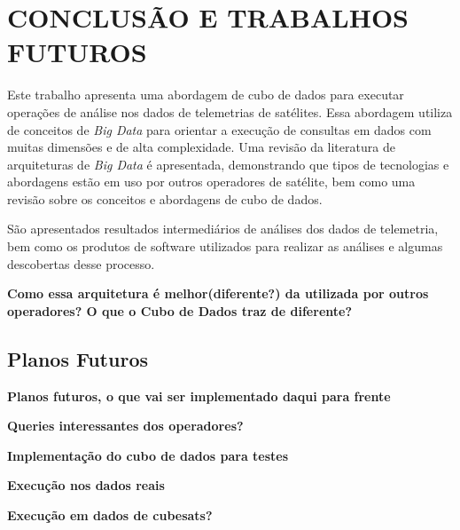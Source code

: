 
\chapter{CONCLUSÃO E TRABALHOS FUTUROS}
\label{ch:concl}

Este trabalho apresenta uma abordagem de cubo de dados para executar operações de análise nos dados de telemetrias de satélites.
Essa abordagem utiliza de conceitos de \textit{Big Data} para orientar a execução de consultas em dados com muitas dimensões e de alta complexidade.
Uma revisão da literatura de arquiteturas de \textit{Big Data} é apresentada, demonstrando que tipos de tecnologias e abordagens estão em uso por outros operadores de satélite, bem como uma revisão sobre os conceitos e abordagens de cubo de dados.

São apresentados resultados intermediários de análises dos dados de telemetria, bem como os produtos de software utilizados para realizar as análises e algumas descobertas desse processo.

\textbf{Como essa arquitetura é melhor(diferente?) da utilizada por outros operadores? O que o Cubo de Dados traz de diferente?}

\section{Planos Futuros}
\label{ch:concl:future}

\textbf{Planos futuros, o que vai ser implementado daqui para frente}

\textbf{Queries interessantes dos operadores?}

\textbf{Implementação do cubo de dados para testes}

\textbf{Execução nos dados reais}

\textbf{Execução em dados de cubesats?}


